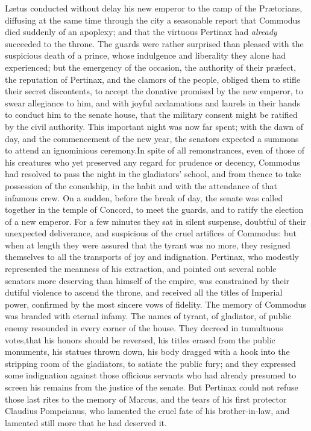 
Lætus conducted without delay his new emperor to the camp of the
Prætorians, diffusing at the same time through the city a
seasonable report that Commodus died suddenly of an apoplexy; and
that the virtuous Pertinax had \textit{already} succeeded to the throne.
The guards were rather surprised than pleased with the suspicious
death of a prince, whose indulgence and liberality they alone had
experienced; but the emergency of the occasion, the authority of
their præfect, the reputation of Pertinax, and the clamors of the
people, obliged them to stifle their secret discontents, to
accept the donative promised by the new emperor, to swear
allegiance to him, and with joyful acclamations and laurels in
their hands to conduct him to the senate house, that the military
consent might be ratified by the civil authority. This important
night was now far spent; with the dawn of day, and the
commencement of the new year, the senators expected a summons to
attend an ignominious ceremony.\footnotemark[461] In spite of all
remonstrances, even of those of his creatures who yet preserved
any regard for prudence or decency, Commodus had resolved to pass
the night in the gladiators’ school, and from thence to take
possession of the consulship, in the habit and with the
attendance of that infamous crew. On a sudden, before the break
of day, the senate was called together in the temple of Concord,
to meet the guards, and to ratify the election of a new emperor.
For a few minutes they sat in silent suspense, doubtful of their
unexpected deliverance, and suspicious of the cruel artifices of
Commodus: but when at length they were assured that the tyrant
was no more, they resigned themselves to all the transports of
joy and indignation. Pertinax, who modestly represented the
meanness of his extraction, and pointed out several noble
senators more deserving than himself of the empire, was
constrained by their dutiful violence to ascend the throne, and
received all the titles of Imperial power, confirmed by the most
sincere vows of fidelity. The memory of Commodus was branded with
eternal infamy. The names of tyrant, of gladiator, of public
enemy resounded in every corner of the house. They decreed in
tumultuous votes,\footnotemark[462] that his honors should be reversed, his
titles erased from the public monuments, his statues thrown down,
his body dragged with a hook into the stripping room of the
gladiators, to satiate the public fury; and they expressed some
indignation against those officious servants who had already
presumed to screen his remains from the justice of the senate.
But Pertinax could not refuse those last rites to the memory of
Marcus, and the tears of his first protector Claudius Pompeianus,
who lamented the cruel fate of his brother-in-law, and lamented
still more that he had deserved it.\footnotemark[47]

